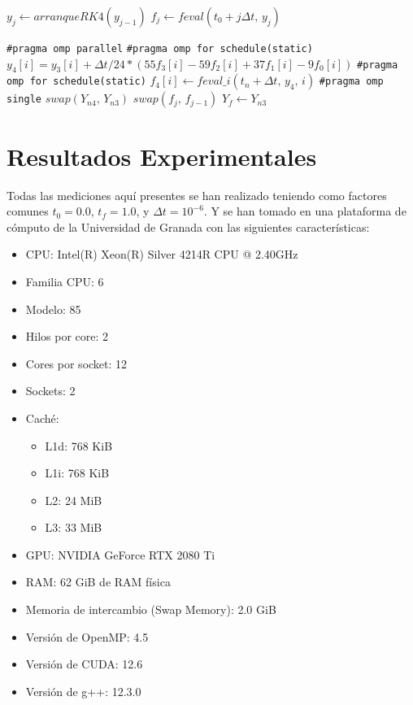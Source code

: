 \begin{algorithm}[H]
	\begin{algorithmic}
			\State $ y_j \gets arranqueRK4(y_{j-1})$ 
		\EndFor
			\State $ f_j \gets feval(t_0+j\Delta t\text{, }y_j)$
		\EndFor
		
		\State \verb|#pragma omp parallel|
			\State \verb|#pragma omp for schedule(static)|
				\State $ y_4[i] = y_3[i] + \Delta t/24 * ( 55f_3[i] - 59f_2[i] + 37f_1[i] -9f_0[i]) $
			\EndFor
			\State \verb|#pragma omp for schedule(static)|
				\State $ f_4[i] \gets feval\_i(t_n+\Delta t\text{, }y_4\text{, }i)$
			\EndFor
			\State \verb|#pragma omp single|
			\State $ swap(Y_{n4}\text{, }Y_{n3}) $
				\State $ swap(f_j\text{, }f_{j-1}) $
			\EndFor
		\EndFor
		\State $Y_f \gets Y_{n3}$
	\end{algorithmic}
	\caption{Implementación de AB4 con Paralelismo por Componentes}
	\label{alg:AB4ParalelismoComponentes}
\end{algorithm}

\section{Resultados Experimentales}

Todas las mediciones aquí presentes se han realizado teniendo como factores comunes $t_0=0.0$, $t_f=1.0$, y $\Delta t= 10^{-6}$. Y se han tomado en una plataforma de cómputo de la Universidad de Granada con las siguientes características:
\begin{itemize}
	\item CPU: Intel(R) Xeon(R) Silver 4214R CPU @ 2.40GHz
	\item Familia CPU: 6
	\item Modelo: 85
	\item Hilos por core: 2
	\item Cores por socket: 12
	\item Sockets: 2
	\item Caché:
	\begin{itemize}
		\item L1d: 768 KiB
		\item L1i: 768 KiB
		\item L2: 24 MiB
		\item L3: 33 MiB
	\end{itemize}
	\item GPU: NVIDIA GeForce RTX 2080 Ti
	\item RAM: 62 GiB de RAM física
	\item Memoria de intercambio (Swap Memory): 2.0 GiB
	\item Versión de OpenMP: 4.5
	\item Versión de CUDA: 12.6
	\item Versión de g++: 12.3.0
\end{itemize}


